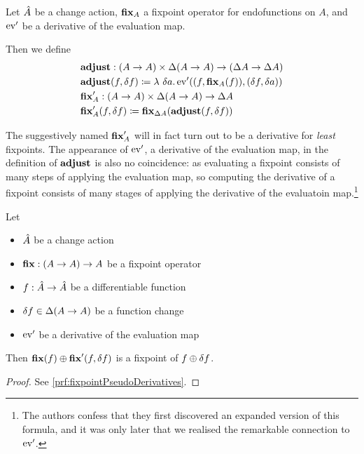 \begin{defn}
\label{def:fixpointDerivatives}
  Let $\hat{A}$ be a change action, $\mathbf{fix}_A$ a fixpoint operator for
  endofunctions on $A$, and $\operatorname{ev}'$ be a derivative of the evaluation map.
  
  Then we define
  \begin{align*}
    &\mathbf{adjust} : (A \rightarrow A) \times \Delta (A \rightarrow A) \rightarrow (\Delta A \rightarrow \Delta A)\\
    &\mathbf{adjust}(f, \delta f) \coloneqq \lambda\ \delta a . \operatorname{ev}'((f, \mathbf{fix}_A(f)), (\delta f, \delta a))\\
    &\mathbf{fix}_A' : (A \rightarrow A) \times \Delta (A \rightarrow A) \rightarrow \Delta A\\
    &\mathbf{fix}_A'(f, \delta f) \coloneqq \mathbf{fix}_{\Delta A}(\mathbf{adjust}(f, \delta f))
  \end{align*}
\end{defn}

The suggestively named $\mathbf{fix}_A'$ will in fact turn out to be a
derivative \textemdash{} for \emph{least} fixpoints. The appearance of
$\operatorname{ev}'$, a derivative of the evaluation map, in the definition of
$\mathbf{adjust}$ is also no coincidence: as evaluating a fixpoint consists of many
steps of applying the evaluation map, so computing the derivative of a fixpoint
consists of many stages of applying the derivative of the evaluatoin
map.\footnote{The authors confess that they first discovered an expanded
  version of this formula, and it was only later that we realised the remarkable
  connection to $\operatorname{ev}'$.}

\begin{thm}[name=Pseudo-derivatives of fixpoints, restate=fixpointPseudoDerivatives]
\label{thm:fixpointPseudoDerivatives}
  Let
  \begin{itemize}
    \item $\hat{A}$ be a change action
    \item $\mathbf{fix} : (A \rightarrow A) \rightarrow A$ be a fixpoint operator
    \item $f: \hat{A} \rightarrow \hat{A}$ be a differentiable function
    \item $\delta f \in \Delta (A \rightarrow A)$ be a function change 
    \item $\operatorname{ev}'$ be a derivative of the evaluation map
  \end{itemize}
  Then $\mathbf{fix}(f) \oplus \mathbf{fix}'(f, \delta f)$ is a fixpoint
  of $f \oplus \delta f$.
\end{thm}
\ifproofs
\begin{proof}
  See \cref{prf:fixpointPseudoDerivatives}.
\end{proof}
\fi

